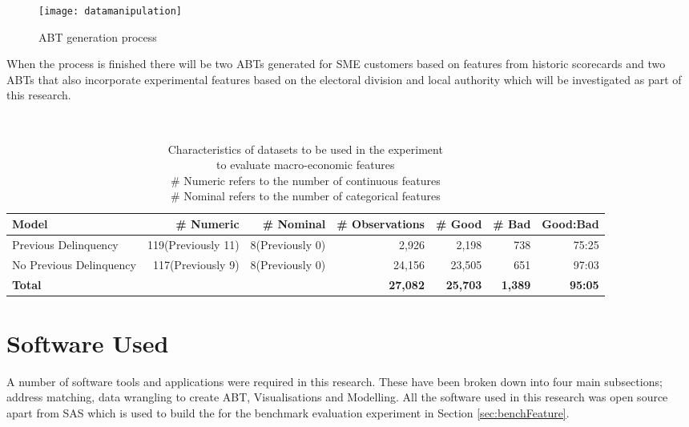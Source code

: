 \begin{figure}[H]
	\texttt{[image: datamanipulation]}
	\caption{ABT generation process}
	\label{fig:datamanipulation}
\end{figure}

When the process is finished there will be two ABTs generated for SME customers based on features from historic scorecards and two ABTs that also incorporate experimental features based on the electoral division and local authority which will be investigated as part of this research.

\begin{table}[H]
	\centering\
	\resizebox{\textwidth}{!}
	{
		\begin{tabular}{l r r r r r r}
			\hline
			\textbf{Model} &  \textbf{\# Numeric} & \textbf{\# Nominal} & \textbf{\# Observations} & \textbf{\# Good} & \textbf{\# Bad} & \textbf{Good:Bad}\\
			\hline
			Previous Delinquency & 119(Previously 11) & 8(Previously 0) & 2,926 & 2,198  & 738 & 75:25 \\ 
			No Previous Delinquency & 117(Previously 9)  & 8(Previously 0) & 24,156 & 23,505 & 651  & 97:03 \\ \hline
			\textbf{Total} &  &  & \textbf{27,082} & \textbf{25,703} & \textbf{1,389} & \textbf{95:05} \\ \hline
		\end{tabular}
	}
	\caption{Characteristics of datasets to be used in the experiment \\to evaluate macro-economic features \\
		\# Numeric refers to the number of continuous features \\
		\# Nominal refers to the number of categorical features
	}
	\label{characteristicsMacroDatasets}
\end{table}

\section{Software Used}\label{chp3:softwareUsed}
A number of software tools and applications were required in this research. These have been broken down into four main subsections; address matching, data wrangling to create ABT, Visualisations and Modelling. All the software used in this research was open source apart from SAS which is used to build the for the benchmark evaluation experiment in Section \ref{sec:benchFeature}. 
 
